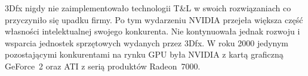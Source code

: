3Dfx nigdy nie zaimplementowało technologii T\&L w swoich rozwiązaniach co przyczyniło się upadku firmy. Po tym wydarzeniu NVIDIA przejeła większa część własności intelektualnej swojego konkurenta. Nie kontynuowała jednak rozwoju i wsparcia jednostek sprzętowych wydanych przez 3Dfx. W roku 2000 jedynym pozostającymi konkurentami na rynku GPU była NVIDIA z kartą graficzną GeForce~2 oraz ATI z serią produktów Radeon~7000.

